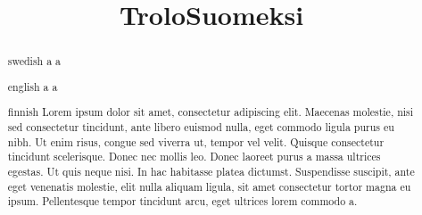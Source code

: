 \begin{abstract}{swedish}
  a  a \\
\end{abstract}

\title{Trolo}
\begin{abstract}{english}
  a  a \\
\end{abstract}

\title{Suomeksi}
\begin{abstract}{finnish}
  Lorem ipsum dolor sit amet, consectetur adipiscing elit. Maecenas molestie, nisi sed consectetur tincidunt, ante libero euismod nulla, eget commodo ligula purus eu nibh. Ut enim risus, congue sed viverra ut, tempor vel velit. Quisque consectetur tincidunt scelerisque. Donec nec mollis leo. Donec laoreet purus a massa ultrices egestas. Ut quis neque nisi. In hac habitasse platea dictumst. Suspendisse suscipit, ante eget venenatis molestie, elit nulla aliquam ligula, sit amet consectetur tortor magna eu ipsum. Pellentesque tempor tincidunt arcu, eget ultrices lorem commodo a.
\end{abstract}


